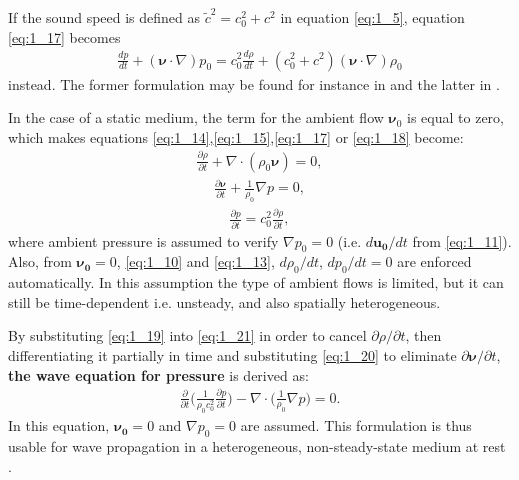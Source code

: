         If the sound speed is defined as $\tilde c^2 = c_0^2+c^2$ in equation \ref{eq:1_5}, equation \ref{eq:1_17} becomes
        \begin{align} \label{eq:1_18}
            \frac{d p}{d t}+(\bm{\nu}\cdot\nabla)p_0 = c_0^2 \frac{d \rho}{d t}+(c_0^2 + c^2)(\bm{\nu}\cdot\nabla)\rho_0
        \end{align}
        instead. The former formulation may be found for instance in \cite{Godin2011Anexactwave} and the latter in \cite{Brekhovskikh1998AcousticsofLayered}.

        In the case of a static medium, the term for the ambient flow $\bm{\nu}_0$ is equal to zero, which makes equations \ref{eq:1_14},\ref{eq:1_15},\ref{eq:1_17} or
\ref{eq:1_18} become:
        \begin{align} \label{eq:1_19}
            \frac{\partial \rho}{\partial t}+\nabla\cdot(\rho_0 \bm{\nu})=0,
        \end{align}
\vspace*{-7mm}
        \begin{align} \label{eq:1_20}
            \frac{\partial \bm{\nu}}{\partial t}+\frac{1}{\rho_0}\nabla p=0,
        \end{align}
\vspace*{-7mm}
        \begin{align} \label{eq:1_21}
            \frac{\partial p}{\partial t}=c_0^2\frac{\partial \rho}{\partial t},
        \end{align}
        where ambient pressure is assumed to verify $\nabla p_0=0$ (i.e. $d\bm{u_0}/dt$ from \ref{eq:1_11}). Also, from $\bm{\nu_0}=0$, \ref{eq:1_10} and \ref{eq:1_13},
$d\rho_0/d t$, $d p_0/dt=0$ are enforced automatically. In this assumption the type of ambient flows is limited, but it can still be time-dependent i.e. unsteady,
and also spatially heterogeneous.

        By substituting \ref{eq:1_19} into \ref{eq:1_21} in order to cancel $\partial \rho/\partial t$, then differentiating it partially in time and
substituting \ref{eq:1_20} to eliminate $\partial \bm{\nu}/\partial t$, \textbf{the wave equation for pressure} is derived as:
        \begin{align} \label{eq:1_22}
            \frac{\partial}{\partial t}\biggl(\frac{1}{\rho_0 c_0^2}\frac{\partial p}{\partial t} \biggr) - \nabla\cdot\biggl(\frac{1}{\rho_0}\nabla p
\biggr)=0.
        \end{align}
        In this equation, $\bm{\nu_0}=0$ and $\nabla p_0=0$ are assumed. This formulation is thus usable for wave propagation in a heterogeneous,
non-steady-state medium at rest \parencite{Brekhovskikh1998AcousticsofLayered}.

